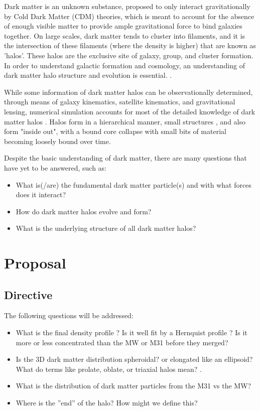 \documentclass{aastex63}
\begin{document}
Dark matter is an unknown substance, proposed to only interact gravitationally by Cold Dark Matter (CDM) theories, which is meant to account for the absence of enough visible matter to provide ample gravitational force to bind galaxies together. On large scales, dark matter tends to cluster into filaments, and it is the intersection of these filaments (where the density is higher) that are known as 'halos'. These halos are the exclusive site of galaxy, group, and cluster formation. In order to understand galactic formation and cosmology, an understanding of dark matter halo structure and evolution is essential. \cite{Drakos2019II}.


While some information of dark matter halos can be observationally determined, through means of galaxy kinematics, satellite kinematics, and gravitational lensing, numerical simulation accounts for most of the detailed knowledge of dark matter halos \citep{Drakos2019I}. Halos form in a hierarchical manner, small structures , and also form "inside out", with a bound core collapse with small bits of material becoming loosely bound over time. \cite{Frenk2012}


Despite the basic understanding of dark matter, there are many questions that have yet to be answered, such as:
\begin{itemize}
        \item What is(/are) the fundamental dark matter particle(s) and with what forces does it interact?
        \item How do dark matter halos evolve and form?
        \item What is the underlying structure of all dark matter halos?
\end{itemize}




\section{Proposal} \label{sec:style}


\subsection{Directive} \label{subsec:directive}
The following questions will be addressed:
\begin{itemize}
        \item What is the final density profile ? Is it well fit by a Hernquist profile ? Is it more or less concentrated than the MW or M31 before they merged?
        \item Is the 3D dark matter distribution spheroidal? or elongated like an ellipsoid? What do terms like prolate, oblate, or triaxial halos mean? \citep{Law2009}.
        \item What is the distribution of dark matter particles from the M31 vs the MW?
        \item Where is the ”end” of the halo? How might we define this?
    \end{itemize}
    
\end{document}
